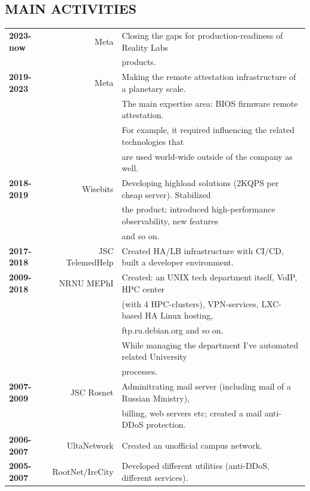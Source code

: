 \begin{resume}
\section{MAIN ACTIVITIES}
\vspace{0.1in} 
\begin{tabular}{lrl}
    {\bf 2023-now}  & Meta            & Closing the gaps for production-readiness of Reality Labs\\
                    &                 & products.\\
    {\bf 2019-2023} & Meta            & Making the remote attestation infrastructure of a planetary scale.\\
                    &                 & The main expertise area: BIOS firmware remote attestation.\\
                    &                 & For example, it required influencing the related technologies that\\
                    &                 & are used world-wide outside of the company as well.\\
    {\bf 2018-2019} & Wisebits        & Developing highload solutions (2KQPS per cheap server). Stabilized\\
                    &                 & the product; introduced high-performance observability, new features\\
                    &                 & and so on.\\
    {\bf 2017-2018} & JSC TelemedHelp & Created HA/LB infrastructure with CI/CD, built a developer environment.\\
    {\bf 2009-2018} & NRNU MEPhI      & Created: an UNIX tech department itself, VoIP, HPC center\\
                    &                 & (with 4 HPC-clusters), VPN-services, LXC-based HA Linux hosting,\\
                    &                 & ftp.ru.debian.org and so on.\\
                    &                 & While managing the department I've automated related University\\
                    &                 & processes.\\
    {\bf 2007-2009} & JSC Rosnet      & Adminitrating mail server (including mail of a Russian Ministry),\\
                    &                 & billing, web servers etc; created a mail anti-DDoS protection.\\
    {\bf 2006-2007} & UltaNetwork     & Created an unofficial campus network.\\
    {\bf 2005-2007} & RootNet/IrcCity & Developed different utilities (anti-DDoS, different services).\\
\end{tabular}
\end{resume}
